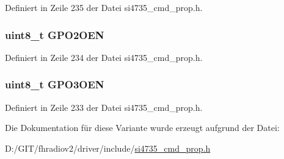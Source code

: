 Definiert in Zeile 235 der Datei si4735\+\_\+cmd\+\_\+prop.\+h.

\hypertarget{unionfm__gpio__ctl__arg1_aa16577946f684dfeeee75c5552b2cf32}{}
\subsubsection[{G\+P\+O2\+O\+E\+N}]{\setlength{\rightskip}{0pt plus 5cm}uint8\+\_\+t G\+P\+O2\+O\+E\+N}\label{unionfm__gpio__ctl__arg1_aa16577946f684dfeeee75c5552b2cf32}


Definiert in Zeile 234 der Datei si4735\+\_\+cmd\+\_\+prop.\+h.

\hypertarget{unionfm__gpio__ctl__arg1_a64a711e579f7c8b59e983c9bd6f9dfca}{}
\subsubsection[{G\+P\+O3\+O\+E\+N}]{\setlength{\rightskip}{0pt plus 5cm}uint8\+\_\+t G\+P\+O3\+O\+E\+N}\label{unionfm__gpio__ctl__arg1_a64a711e579f7c8b59e983c9bd6f9dfca}


Definiert in Zeile 233 der Datei si4735\+\_\+cmd\+\_\+prop.\+h.



Die Dokumentation für diese Variante wurde erzeugt aufgrund der Datei\+:\begin{DoxyCompactItemize}
\item 
D\+:/\+G\+I\+T/fhradiov2/driver/include/\hyperlink{si4735__cmd__prop_8h}{si4735\+\_\+cmd\+\_\+prop.\+h}\end{DoxyCompactItemize}
